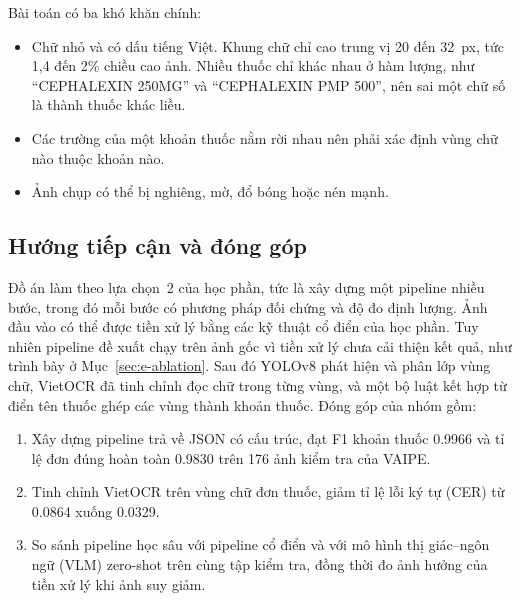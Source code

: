 Bài toán có ba khó khăn chính:
\begin{itemize}
  \item Chữ nhỏ và có dấu tiếng Việt. Khung chữ chỉ cao trung vị 20 đến 32~px, tức 1,4 đến 2\% chiều cao ảnh. Nhiều thuốc chỉ khác nhau ở hàm lượng, như ``CEPHALEXIN 250MG'' và ``CEPHALEXIN PMP 500'', nên sai một chữ số là thành thuốc khác liều.
  \item Các trường của một khoản thuốc nằm rời nhau nên phải xác định vùng chữ nào thuộc khoản nào.
  \item Ảnh chụp có thể bị nghiêng, mờ, đổ bóng hoặc nén mạnh.
\end{itemize}

\subsection{Hướng tiếp cận và đóng góp}\label{sec:approach}
Đồ án làm theo lựa chọn~2 của học phần, tức là xây dựng một pipeline nhiều bước, trong đó mỗi bước có phương pháp đối chứng và độ đo định lượng.
Ảnh đầu vào có thể được tiền xử lý bằng các kỹ thuật cổ điển của học phần. Tuy nhiên pipeline đề xuất chạy trên ảnh gốc vì tiền xử lý chưa cải thiện kết quả, như trình bày ở Mục~\ref{sec:e-ablation}.
Sau đó YOLOv8 phát hiện và phân lớp vùng chữ, VietOCR đã tinh chỉnh đọc chữ trong từng vùng, và một bộ luật kết hợp từ điển tên thuốc ghép các vùng thành khoản thuốc.
Đóng góp của nhóm gồm:
\begin{enumerate}
  \item Xây dựng pipeline trả về JSON có cấu trúc, đạt F1 khoản thuốc \num{0.9966} và tỉ lệ đơn đúng hoàn toàn \num{0.9830} trên 176 ảnh kiểm tra của VAIPE.
  \item Tinh chỉnh VietOCR trên vùng chữ đơn thuốc, giảm tỉ lệ lỗi ký tự (CER) từ \num{0.0864} xuống \num{0.0329}.
  \item So sánh pipeline học sâu với pipeline cổ điển và với mô hình thị giác--ngôn ngữ (VLM) zero-shot trên cùng tập kiểm tra, đồng thời đo ảnh hưởng của tiền xử lý khi ảnh suy giảm.
\end{enumerate}
